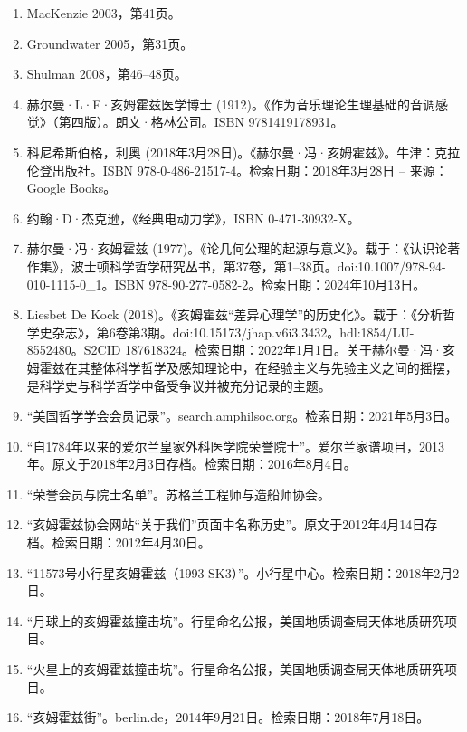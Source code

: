 \begin{enumerate}
\item MacKenzie 2003，第41页。
\item Groundwater 2005，第31页。
\item Shulman 2008，第46–48页。
\item 赫尔曼·L·F·亥姆霍兹医学博士 (1912)。《作为音乐理论生理基础的音调感觉》（第四版）。朗文·格林公司。ISBN 9781419178931。
\item 科尼希斯伯格，利奥 (2018年3月28日)。《赫尔曼·冯·亥姆霍兹》。牛津：克拉伦登出版社。ISBN 978-0-486-21517-4。检索日期：2018年3月28日 – 来源：Google Books。
\item 约翰·D·杰克逊，《经典电动力学》，ISBN 0-471-30932-X。
\item 赫尔曼·冯·亥姆霍兹 (1977)。《论几何公理的起源与意义》。载于：《认识论著作集》，波士顿科学哲学研究丛书，第37卷，第1–38页。doi:10.1007/978-94-010-1115-0\_1。ISBN 978-90-277-0582-2。检索日期：2024年10月13日。
\item Liesbet De Kock (2018)。《亥姆霍兹“差异心理学”的历史化》。载于：《分析哲学史杂志》，第6卷第3期。doi:10.15173/jhap.v6i3.3432。hdl:1854/LU-8552480。S2CID 187618324。检索日期：2022年1月1日。关于赫尔曼·冯·亥姆霍兹在其整体科学哲学及感知理论中，在经验主义与先验主义之间的摇摆，是科学史与科学哲学中备受争议并被充分记录的主题。
\item “美国哲学学会会员记录”。search.amphilsoc.org。检索日期：2021年5月3日。
\item “自1784年以来的爱尔兰皇家外科医学院荣誉院士”。爱尔兰家谱项目，2013年。原文于2018年2月3日存档。检索日期：2016年8月4日。
\item “荣誉会员与院士名单”。苏格兰工程师与造船师协会。
\item “亥姆霍兹协会网站“关于我们”页面中名称历史”。原文于2012年4月14日存档。检索日期：2012年4月30日。
\item “11573号小行星亥姆霍兹（1993 SK3）”。小行星中心。检索日期：2018年2月2日。
\item “月球上的亥姆霍兹撞击坑”。行星命名公报，美国地质调查局天体地质研究项目。
\item “火星上的亥姆霍兹撞击坑”。行星命名公报，美国地质调查局天体地质研究项目。
\item “亥姆霍兹街”。berlin.de，2014年9月21日。检索日期：2018年7月18日。
\end{enumerate}